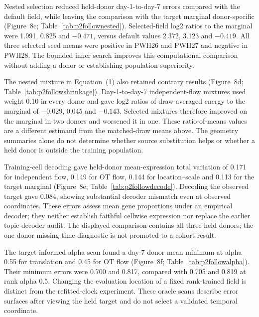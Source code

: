 \documentclass[10pt,a4paper]{article}
\begin{document}
Nested selection reduced held-donor day-1-to-day-7 errors compared with the default field, while leaving the comparison with the target marginal donor-specific (Figure~8c; Table~\ref{tab:p2follownested}). Selected-field log2 ratios to the marginal were 1.991, 0.825 and $-0.471$, versus default values 2.372, 3.123 and $-0.419$. All three selected seed means were positive in PWH26 and PWH27 and negative in PWH28. The bounded inner search improves this computational comparison without adding a donor or establishing population superiority.

The nested mixture in Equation~(1) also retained contrary results (Figure~8d; Table~\ref{tab:p2followshrinkage}). Day-1-to-day-7 independent-flow mixtures used weight 0.10 in every donor and gave log2 ratios of draw-averaged energy to the marginal of $-0.029$, 0.045 and $-0.143$. Selected mixtures therefore improved on the marginal in two donors and worsened it in one. These ratio-of-means values are a different estimand from the matched-draw means above. The geometry summaries alone do not determine whether source substitution helps or whether a held donor is outside the training population.

Training-cell decoding gave held-donor mean-expression total variation of 0.171 for independent flow, 0.149 for OT flow, 0.144 for location--scale and 0.113 for the target marginal (Figure~8e; Table~\ref{tab:p2followdecode}). Decoding the observed target gave 0.084, showing substantial decoder mismatch even at observed coordinates. These errors assess mean gene proportions under an empirical decoder; they neither establish faithful cellwise expression nor replace the earlier topic-decoder audit. The displayed comparison contains all three held donors; the one-donor missing-time diagnostic is not promoted to a cohort result.

The target-informed alpha scan found a day-7 donor-mean minimum at alpha 0.55 for translation and 0.45 for OT flow (Figure~8f; Table~\ref{tab:p2followalpha}). Their minimum errors were 0.700 and 0.817, compared with 0.705 and 0.819 at rank alpha 0.5. Changing the evaluation location of a fixed rank-trained field is distinct from the refitted-clock experiment. These oracle scans describe error surfaces after viewing the held target and do not select a validated temporal coordinate.

\end{document}
